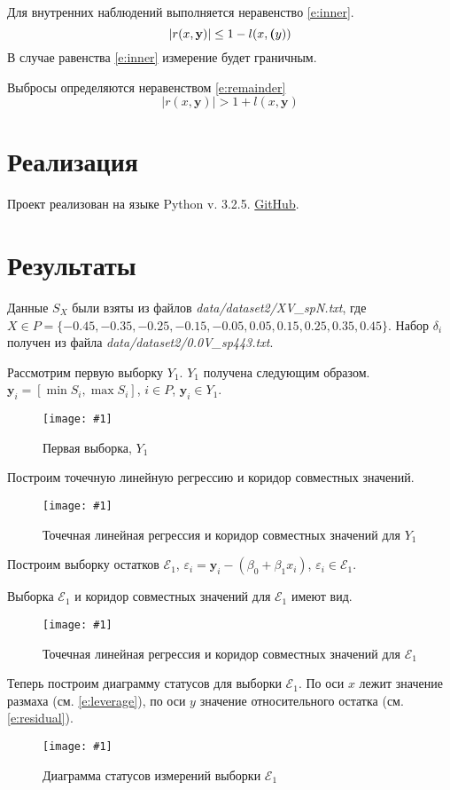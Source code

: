\documentclass[a4paper,12pt]{article}
\newcommand{\plot}[3]{
    \begin{figure}[H]
        \begin{center}
            \texttt{[image: \#1]}
            \caption{#2}
            \label{#3}
        \end{center}
    \end{figure}
}
\begin{document}
    Для внутренних наблюдений выполняется неравенство \ref{e:inner}.
    \begin{equation}
        |r(x, \textbf{y})| \leq 1 - l(x, \textbf(y))
        \label{e:inner}
    \end{equation}
    В случае равенства \ref{e:inner} измерение будет граничным.

    Выбросы определяются неравенством \ref{e:remainder}
    \begin{equation}
        |r(x, \textbf{y})| > 1 + l(x, \textbf{y})
        \label{e:remainder}
    \end{equation}

    \section{Реализация}
    \quad Проект реализован на языке Python v. 3.2.5.
    \href{https://github.com/HellInsider/Intervals_2}{GitHub}.

    \section{Результаты}
    \quad Данные $ S_X $ были взяты из файлов \textsl{data/dataset2/XV\_spN.txt}, \newline
    где $ X \in P = \{-0.45, -0.35, -0.25, -0.15, -0.05, 0.05, 0.15, 0.25, 0.35, 0.45 \} $.
    Набор $ \delta_i $ получен из файла \textsl{data/dataset2/0.0V\_sp443.txt}.

    Рассмотрим первую выборку $ Y_1 $. $ Y_1 $ получена следующим образом.
    $ \textbf{y}_i = [\min{S_i}, \max{S_i}]$, $ i \in P $, $ \textbf{y}_i \in Y_1 $.
    \plot{SampleX1}{Первая выборка, $ Y_1 $}{p:sampleX1}

    Построим точечную линейную регрессию и коридор совместных значений.
    \plot{InformSetCorridorX1}{Точечная линейная регрессия и коридор совместных значений для $ Y_1 $}{p:informSetCorridorX1}

    Построим выборку остатков $ \mathcal{E}_1 $, $ \varepsilon_i = \textbf{y}_i - (\beta_0 + \beta_1 x_i) $,
    $ \varepsilon_i \in \mathcal{E}_1 $.

    Выборка $ \mathcal{E}_1 $ и коридор совместных значений для $ \mathcal{E}_1 $ имеют вид.
    \plot{InformSetCorridorRemX1}{Точечная линейная регрессия и коридор совместных значений для $ \mathcal{E}_1 $}{p:informSetCorridorRemX1}

    Теперь построим диаграмму статусов для выборки $ \mathcal{E}_1 $.
    По оси $ x $ лежит значение размаха (см. \ref{e:leverage}), по оси $ y $ значение относительного остатка (см. \ref{e:residual}).
    \plot{DiagramStatusX1}{Диаграмма статусов измерений выборки $ \mathcal{E}_1 $}{p:diagramStatusX1}
\end{document}
